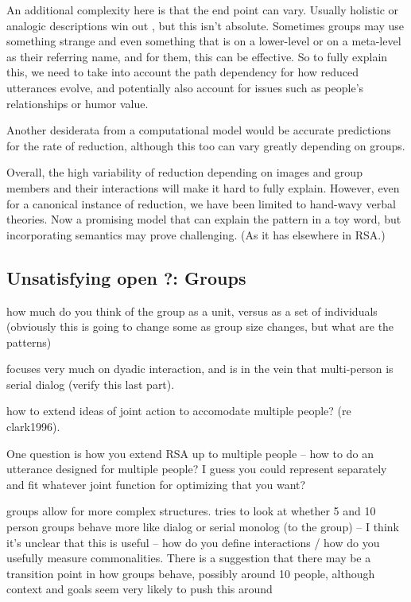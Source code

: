 \documentclass[]{article}
\begin{document}
An additional complexity here is that the end point can vary. Usually holistic or analogic descriptions win out \cite{clark1986}, but this isn't absolute. Sometimes groups may use something strange and even something that is on a lower-level or on a meta-level as their referring name, and for them, this can be effective. So to fully explain this, we need to take into account the path dependency for how reduced utterances evolve, and potentially also account for issues such as people's relationships or humor value. 

Another desiderata from a computational model would be accurate predictions for the rate of reduction, although this too can vary greatly depending on groups. 

Overall, the high variability of reduction depending on images and group members and their interactions will make it hard to fully explain. However, even for a canonical instance of reduction, we have been limited to hand-wavy verbal theories. Now a promising model that can explain the pattern in a toy word, but incorporating semantics may prove challenging. (As it has elsewhere in RSA.) 








\subsection{Unsatisfying open ?: Groups}


\cite{yoon2019} how much do you think of the group as a unit, versus as a set of individuals (obviously this is going to change some as group size changes, but what are the patterns) 

\cite{clark1996} focuses very much on dyadic interaction, and is in the vein that multi-person is serial dialog (verify this last part). 

how to extend ideas of joint action to accomodate multiple people? (re clark1996). 

One question is how you extend RSA up to multiple people -- how to do an utterance designed for multiple people? I guess you could represent separately and fit whatever joint function for optimizing that you want? 

groups allow for more complex structures. \cite{fay2000} tries to look at whether 5 and 10 person groups behave more like dialog or serial monolog (to the group) -- I think it's unclear that this is useful -- how do you define interactions / how do you usefully measure commonalities. There is a suggestion that there may be a transition point in how groups behave, possibly around 10 people, although context and goals seem very likely to push this around 
\end{document}
